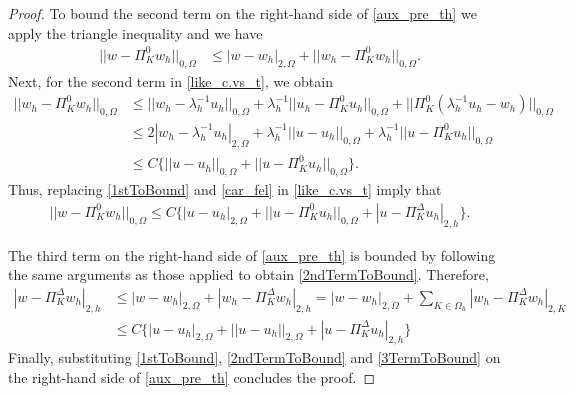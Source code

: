 \documentclass[10pt,a4paper]{amsart}
\def\O{\Omega}
\def\PiK{\Pi_{K}^{\Delta}}
\begin{document}
\begin{proof}
To bound the second term on the right-hand side of \eqref{aux_pre_th} we apply the triangle inequality and we have
\begin{align}
||w-\Pi_K^0 w_h||_{0,\Omega}&\leq |w-w_h|_{2,\O}+||w_h-\Pi_K^0  w_h||_{0,\Omega}\label{like_c.vs_t}.
\end{align}
Next, for the second term in \eqref{like_c.vs_t}, we obtain
\begin{align}
||w_h-\Pi_K^0  w_h||_{0,\Omega}&\leq ||w_h-\lambda_h^{-1}u_h||_{0,\O}+\lambda_h^{-1}||u_h-\Pi_K^0 u_h||_{0,\Omega}+||\Pi_K^0(\lambda_h^{-1}u_h-w_h)||_{0,\Omega}\nonumber\\
&\leq 2|w_h-\lambda_h^{-1}u_h|_{2,\O}+\lambda_h^{-1}||u-u_h||_{0,\O}+\lambda_h^{-1}||u-\Pi_K^0 u_h||_{0,\Omega}\nonumber\\
&\leq C\Big\{||u-u_h||_{0,\O}+||u-\Pi_K^0 u_h||_{0,\Omega}\Big\}\label{car_fel}.
\end{align}
Thus, replacing  \eqref{1stToBound} and \eqref{car_fel} in \eqref{like_c.vs_t} imply that
\begin{align}
||w-\Pi_K^0  w_h||_{0,\Omega}\leq C\Big\{|u-u_h|_{2,\O}+||u-\Pi_K^0  u_h||_{0,\Omega}+|u-\PiK  u_h|_{2,h} \Big\}\label{2ndTermToBound}.
\end{align}

The third term on the right-hand side of \eqref{aux_pre_th} is bounded by following the same arguments as those applied to obtain \eqref{2ndTermToBound}. Therefore,
\begin{align}
|w-\PiK w_h|_{2,h}&\leq |w-w_h|_{2,\Omega}+|w_h-\PiK   w_h|_{2,h}=|w-w_h|_{2,\Omega}+\sum\limits_{K\in \Omega_h}|w_h-\PiK   w_h|_{2,K}\nonumber\\
&\leq C\Big\{|u-u_h|_{2,\Omega}+ ||u-u_h||_{2,\O}+|u-\PiK u_h|_{2,h}\Big\}\label{3TermToBound}
\end{align}
Finally, substituting  \eqref{1stToBound}, \eqref{2ndTermToBound} and \eqref{3TermToBound} on the right-hand side of \eqref{aux_pre_th} concludes the proof.
\end{proof}
\end{document}
